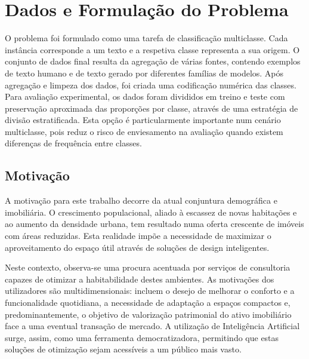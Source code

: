 \documentclass[a4paper,12pt]{scrreprt}
\begin{document}
\chapter{Dados e Formulação do Problema}
    O problema foi formulado como uma tarefa de classificação multiclasse. Cada instância corresponde a um texto e a respetiva classe representa a sua origem. O conjunto de dados final resulta da agregação de várias fontes, contendo exemplos de texto humano e de texto gerado por diferentes famílias de modelos. Após agregação e limpeza dos dados, foi criada uma codificação numérica das classes. Para avaliação experimental, os dados foram divididos em treino e teste com preservação aproximada das proporções por classe, através de uma estratégia de divisão estratificada. Esta opção é particularmente importante num cenário multiclasse, pois reduz o risco de enviesamento na avaliação quando existem diferenças de frequência entre classes.

    \section{Motivação}
        A motivação para este trabalho decorre da atual conjuntura demográfica e imobiliária. O crescimento populacional, aliado à escassez de novas habitações e ao aumento da densidade urbana, tem resultado numa oferta crescente de imóveis com áreas reduzidas. Esta realidade impõe a necessidade de maximizar o aproveitamento do espaço útil através de soluções de design inteligentes.

        Neste contexto, observa-se uma procura acentuada por serviços de consultoria capazes de otimizar a habitabilidade destes ambientes. As motivações dos utilizadores são multidimensionais: incluem o desejo de melhorar o conforto e a funcionalidade quotidiana, a necessidade de adaptação a espaços compactos e, predominantemente, o objetivo de valorização patrimonial do ativo imobiliário face a uma eventual transação de mercado. A utilização de Inteligência Artificial surge, assim, como uma ferramenta democratizadora, permitindo que estas soluções de otimização sejam acessíveis a um público mais vasto.



\end{document}
